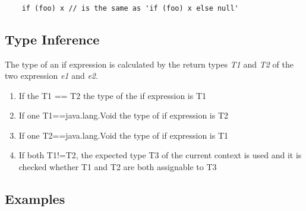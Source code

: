 \documentclass[a4paper,10pt]{scrreprt}
\newlength{\itemindentlen}
\begin{document}
\begin{lstlisting}

	if (foo) x // is the same as 'if (foo) x else null' 

\end{lstlisting}





\subsection{ Type Inference }
\label{IfTypeInference}

The type of an if expression is calculated by the return types \emph{T1} and \emph{T2} of the two expression \emph{e1} and \emph{e2}.

\setlength{\itemindentlen}{\textwidth}
\begin{enumerate}
\addtolength{\itemindentlen}{-2em}

\item \begin{minipage}[t]{\itemindentlen}
If the T1 == T2 the type of the if expression is T1
\end{minipage}

\item \begin{minipage}[t]{\itemindentlen}
If one T1==java.lang.Void the type of if expression is T2
\end{minipage}

\item \begin{minipage}[t]{\itemindentlen}
If one T2==java.lang.Void the type of if expression is T1
\end{minipage}

\item \begin{minipage}[t]{\itemindentlen}
If both T1!=T2, the expected type T3 of the current context is used and it is checked whether T1 and T2 are both assignable to T3
\end{minipage}

\end{enumerate}
\addtolength{\itemindentlen}{2em}





\subsection{ Examples }
\end{document}
